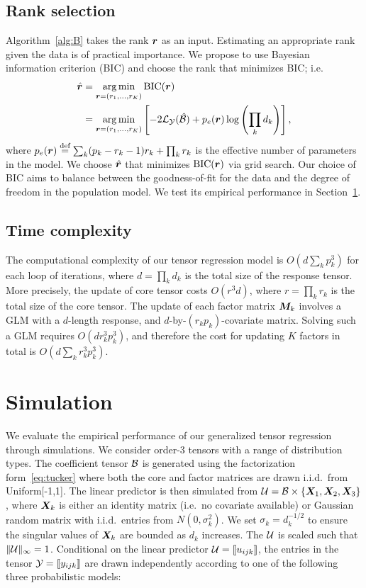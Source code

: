\documentclass[12pt]{article}
\theoremstyle{plain}
\theoremstyle{definition}
\begin{document}
\subsection{Rank selection}\label{sec:tuning}
Algorithm~\ref{alg:B} takes the rank $\bm{r}$ as an input. Estimating an appropriate rank given the data is of practical importance. We propose to use Bayesian information criterion (BIC) and choose the rank that minimizes BIC; i.e.
\begin{align}\label{eq:BIC}
\hat {\bm{r}}&=\operatorname*{arg\,min}_{\bm{r}=(r_1,\ldots,r_K)} \text{BIC}(\bm{r})\\
&=\operatorname*{arg\,min}_{\bm{r}=(r_1,\ldots,r_K)}\left[-2\mathcal{L}_{\mathcal{Y}}(\hat {\mathcal{B}})+p_e(\bm{r})\log \left(\prod_k d_k\right) \right],
\end{align}
where $p_e(\bm{r})\stackrel{\text{def}}{=}\sum_k (p_k-r_k-1)r_k+\prod_k r_k$ is the effective number of parameters in the model. We choose $\hat {\bm{r}}$ that minimizes $\text{BIC}(\bm{r})$ via grid search. Our choice of BIC aims to balance between the goodness-of-fit for the data and the degree of freedom in the population model. We test its empirical performance in Section~\ref{sec:simulation}.  

\subsection{Time complexity}
The computational complexity of our tensor regression model is $O\left(d \sum_k p^3_k\right)$ for each loop of iterations, where $d=\prod_k d_k$ is the total size of the response tensor. More precisely, the update of core tensor costs $O(r^3d)$, where $r=\prod_k r_k$ is the total size of the core tensor. The update of each factor matrix $\bm M_k$ involves a GLM with a $d$-length response, and $d$-by-$(r_kp_k)$-covariate matrix. Solving such a GLM requires $O(dr^3_kp^3_k)$, and therefore the cost for updating $K$ factors in total is $O( d\sum_k r^3_k p_k^3)$.

\section{Simulation}\label{sec:simulation}
We evaluate the empirical performance of our generalized tensor regression through simulations. We consider order-3 tensors with a range of distribution types. The coefficient tensor $\mathcal{B}$ is generated using the factorization form~\eqref{eq:tucker} where both the core and factor matrices are drawn i.i.d.\ from Uniform[-1,1]. The linear predictor is then simulated from $\mathcal{U}=\mathcal{B}\times\{\bm X_1,\bm X_2,\bm X_3\}$, where $\bm X_k$ is either an identity matrix (i.e.\ no covariate available) or Gaussian random matrix with i.i.d.\ entries from $N(0,\sigma_k^2)$. We set $\sigma_k=d_k^{-1/2}$ to ensure the singular values of $\bm X_k$ are bounded as $d_k$ increases. The $\mathcal{U}$ is scaled such that $\lVert\mathcal{U}\rVert_\infty=1$. Conditional on the linear predictor $\mathcal{U}=\llbracket u_{ijk} \rrbracket$, the entries in the tensor $\mathcal{Y}=\llbracket y_{ijk} \rrbracket$ are drawn independently according to one of the following three probabilistic models:
\end{document}
